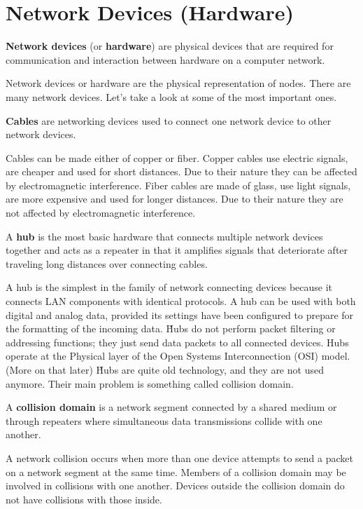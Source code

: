 \stop

\section{Network Devices (Hardware)}

\textbf{Network devices} (or \textbf{hardware}) are physical devices that are required for communication and interaction
between hardware on a computer network.
\ed

Network devices or hardware are the physical representation of nodes. There are many network devices. Let's take a
look at some of the most important ones.

\bd[Cables]
\textbf{Cables} are networking devices used to connect one network device to other network devices.
\ed

Cables can be made either of copper or fiber. Copper cables use electric signals, are cheaper and used for short
distances. Due to their nature they can be affected by electromagnetic interference. Fiber cables are made of glass,
use light signals, are more expensive and used for longer distances. Due to their nature they are not affected by
electromagnetic interference.

\bd[Hub]
A \textbf{hub} is the most basic hardware that connects multiple network devices together and acts as a repeater in
that it amplifies signals that deteriorate after traveling long distances over connecting cables.
\ed


A hub is the simplest in the family of network connecting devices because it connects LAN components with identical
protocols. A hub can be used with both digital and analog data, provided its settings have been configured to prepare
for the formatting of the incoming data. \v

Hubs do not perform packet filtering or addressing functions; they just send data packets to all connected devices.
Hubs operate at the Physical layer of the Open Systems Interconnection (OSI) model. (More on that later) \v

Hubs are quite old technology, and they are not used anymore. Their main problem is something called collision domain.

A \textbf{collision domain} is a network segment connected by a shared medium or through repeaters where simultaneous
data transmissions collide with one another.
\ed

A network collision occurs when more than one device attempts to send a packet on a network segment at the same time.
Members of a collision domain may be involved in collisions with one another. Devices outside the collision domain do
not have collisions with those inside.

